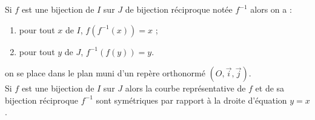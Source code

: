 \begin{prop}
	Si \(f\) est une bijection de \(I\) sur \(J\) de bijection réciproque notée \(f^{-1}\) alors on a :
	\begin{enumerate}
		\item pour tout \(x\) de \(I\), \(f(f^{-1}(x)) = x\) ;
		\item pour tout \(y\) de \(J\), \(f^{-1}(f(y)) = y\).
	\end{enumerate}

\end{prop}

\begin{defprop}
	on se place dans le plan muni d’un repère orthonormé \((O, \vec{i}, \vec{j})\). \\
	Si \(f\) est une bijection de \(I\) sur \(J\) alors la courbe représentative de \(f\) et de sa bijection réciproque \(f^{-1}\) sont symétriques par rapport à la droite d’équation \(y = x\).
\end{defprop}

